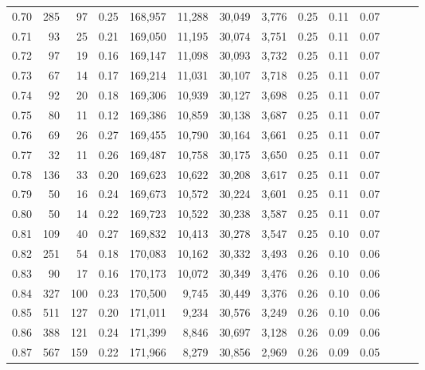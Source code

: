 \begin{tabular}{rrrrrrrrrrrrrr}
0.70 &     285 &     97 &  0.25 &  168,957 &   11,288 &  30,049 &   3,776 &  0.25 &  0.11 &      0.07 \\
0.71 &      93 &     25 &  0.21 &  169,050 &   11,195 &  30,074 &   3,751 &  0.25 &  0.11 &      0.07 \\
0.72 &      97 &     19 &  0.16 &  169,147 &   11,098 &  30,093 &   3,732 &  0.25 &  0.11 &      0.07 \\
0.73 &      67 &     14 &  0.17 &  169,214 &   11,031 &  30,107 &   3,718 &  0.25 &  0.11 &      0.07 \\
0.74 &      92 &     20 &  0.18 &  169,306 &   10,939 &  30,127 &   3,698 &  0.25 &  0.11 &      0.07 \\
0.75 &      80 &     11 &  0.12 &  169,386 &   10,859 &  30,138 &   3,687 &  0.25 &  0.11 &      0.07 \\
0.76 &      69 &     26 &  0.27 &  169,455 &   10,790 &  30,164 &   3,661 &  0.25 &  0.11 &      0.07 \\
0.77 &      32 &     11 &  0.26 &  169,487 &   10,758 &  30,175 &   3,650 &  0.25 &  0.11 &      0.07 \\
0.78 &     136 &     33 &  0.20 &  169,623 &   10,622 &  30,208 &   3,617 &  0.25 &  0.11 &      0.07 \\
0.79 &      50 &     16 &  0.24 &  169,673 &   10,572 &  30,224 &   3,601 &  0.25 &  0.11 &      0.07 \\
0.80 &      50 &     14 &  0.22 &  169,723 &   10,522 &  30,238 &   3,587 &  0.25 &  0.11 &      0.07 \\
0.81 &     109 &     40 &  0.27 &  169,832 &   10,413 &  30,278 &   3,547 &  0.25 &  0.10 &      0.07 \\
0.82 &     251 &     54 &  0.18 &  170,083 &   10,162 &  30,332 &   3,493 &  0.26 &  0.10 &      0.06 \\
0.83 &      90 &     17 &  0.16 &  170,173 &   10,072 &  30,349 &   3,476 &  0.26 &  0.10 &      0.06 \\
0.84 &     327 &    100 &  0.23 &  170,500 &    9,745 &  30,449 &   3,376 &  0.26 &  0.10 &      0.06 \\
0.85 &     511 &    127 &  0.20 &  171,011 &    9,234 &  30,576 &   3,249 &  0.26 &  0.10 &      0.06 \\
0.86 &     388 &    121 &  0.24 &  171,399 &    8,846 &  30,697 &   3,128 &  0.26 &  0.09 &      0.06 \\
0.87 &     567 &    159 &  0.22 &  171,966 &    8,279 &  30,856 &   2,969 &  0.26 &  0.09 &      0.05 \\

\end{tabular}
